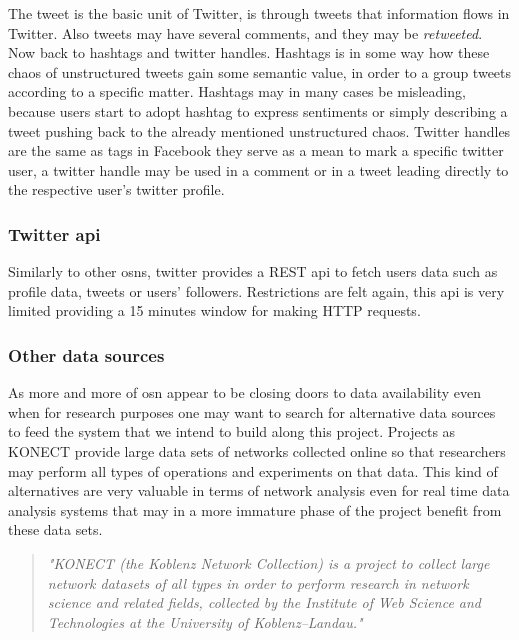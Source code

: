 \indent The tweet is the basic unit of Twitter, is through tweets that information flows in Twitter. Also tweets may have several comments, and they may
be \textit{retweeted}. Now back to hashtags and twitter handles. Hashtags is in some way how these chaos of unstructured tweets gain some semantic
value, in order to a group tweets according to a specific matter. Hashtags may in many cases be misleading, because users
start to adopt hashtag to express sentiments or simply describing a tweet pushing back to the already mentioned unstructured chaos.
Twitter handles are the same as tags in Facebook they serve as a mean to mark a specific twitter user, a twitter handle may be used in a comment or
in a tweet leading directly to the respective user's twitter profile.

\subsubsection*{Twitter \gls{api}}
Similarly to other \glspl{osn}, twitter provides a REST \gls{api} to fetch users data such as profile data, tweets or users' followers. Restrictions are felt again, this \gls{api} is very limited providing a 15 minutes window for making HTTP requests.

\subsubsection*{Other data sources}
\label{sec:otherdatasources}
As more and more of \gls{osn} appear to be closing doors to data availability even when for research purposes one may
want to search for alternative data sources to feed the system that we intend to build along this project. Projects as
KONECT \citep{kunegis2013konect} provide large data sets of networks collected online so that researchers may
perform all types of operations and experiments on that data. This kind of alternatives are very valuable in terms of network
analysis even for real time data analysis systems that may in a more immature phase of the project benefit from these data sets.

\begin{quote}
\textit{"KONECT (the Koblenz Network Collection) is a project to collect large network datasets of all
types in order to perform research in network science and related fields, collected by the Institute
of Web Science and Technologies at the University of Koblenz–Landau."} \citep{kunegis2013konect}
\end{quote}

